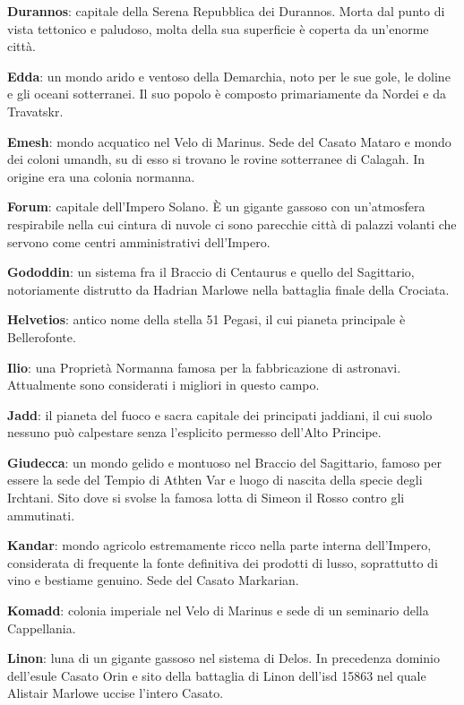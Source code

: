 \textbf{Durannos}: capitale della Serena Repubblica dei Durannos. Morta
dal punto di vista tettonico e paludoso, molta della sua superficie è
coperta da un'enorme città.

\textbf{Edda}: un mondo arido e ventoso della Demarchia, noto per le sue
gole, le doline e gli oceani sotterranei. Il suo popolo è composto
primariamente da Nordei e da Travatskr.

\textbf{Emesh}: mondo acquatico nel Velo di Marinus. Sede del Casato
Mataro e mondo dei coloni umandh, su di esso si trovano le rovine
sotterranee di Calagah. In origine era una colonia normanna.

\textbf{Forum}: capitale dell'Impero Solano. È un gigante gassoso con
un'atmosfera respirabile nella cui cintura di nuvole ci sono parecchie
città di palazzi volanti che servono come centri amministrativi
dell'Impero.

\textbf{Gododdin}: un sistema fra il Braccio di Centaurus e quello del
Sagittario, notoriamente distrutto da Hadrian Marlowe nella battaglia
finale della Crociata.

\textbf{Helvetios}: antico nome della stella 51 Pegasi, il cui pianeta
principale è Bellerofonte.

\textbf{Ilio}: una Proprietà Normanna famosa per la fabbricazione di
astronavi. Attualmente sono considerati i migliori in questo campo.

\textbf{Jadd}: il pianeta del fuoco e sacra capitale dei principati
jaddiani, il cui suolo nessuno può calpestare senza l'esplicito permesso
dell'Alto Principe.

\textbf{Giudecca}: un mondo gelido e montuoso nel Braccio del
Sagittario, famoso per essere la sede del Tempio di Athten Var e luogo
di nascita della specie degli Irchtani. Sito dove si svolse la famosa
lotta di Simeon il Rosso contro gli ammutinati.

\textbf{Kandar}: mondo agricolo estremamente ricco nella parte interna
dell'Impero, considerata di frequente la fonte definitiva dei prodotti
di lusso, soprattutto di vino e bestiame genuino. Sede del Casato
Markarian.

\textbf{Komadd}: colonia imperiale nel Velo di Marinus e sede di un
seminario della Cappellania.

\textbf{Linon}: luna di un gigante gassoso nel sistema di Delos. In
precedenza dominio dell'esule Casato Orin e sito della battaglia di
Linon dell'\foreignlanguage{italian}{isd} 15863 nel quale Alistair
Marlowe uccise l'intero Casato.

